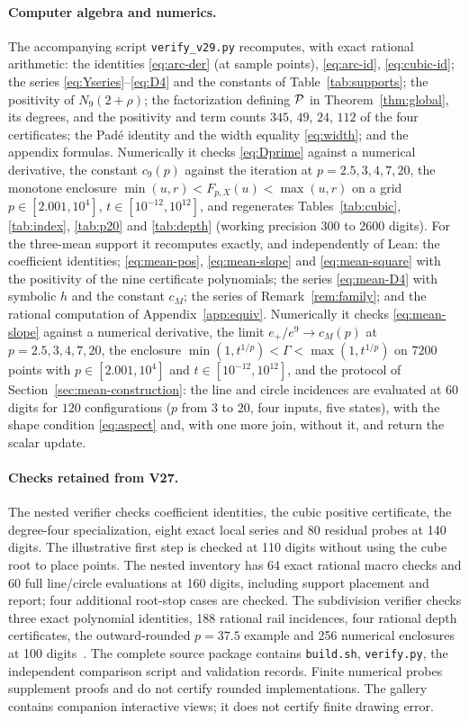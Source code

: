 \paragraph{Computer algebra and numerics.}
The accompanying script \texttt{verify\_v29.py} recomputes, with exact rational arithmetic: the
identities \eqref{eq:arc-der} (at sample points), \eqref{eq:arc-id}, \eqref{eq:cubic-id}; the series
\eqref{eq:Yseries}--\eqref{eq:D4} and the constants of Table~\ref{tab:supports}; the positivity of
$N_9(2+\rho)$; the factorization defining $\mathcal{P}$ in Theorem~\ref{thm:global}, its degrees, and the
positivity and term counts $345$, $49$, $24$, $112$ of the four certificates; the Pad\'e identity and
the width equality \eqref{eq:width}; and the appendix formulas. Numerically it checks
\eqref{eq:Dprime} against a numerical derivative, the constant $c_9(p)$ against the iteration
at $p=2.5,3,4,7,20$, the monotone enclosure $\min(u,r)<F_{p,X}(u)<\max(u,r)$ on a grid
$p\in[2.001,10^{4}]$, $t\in[10^{-12},10^{12}]$, and regenerates Tables~\ref{tab:cubic}, \ref{tab:index},
\ref{tab:p20} and \ref{tab:depth} (working precision 300 to 2600 digits). For the three-mean support
it recomputes exactly, and independently of Lean: the coefficient identities; \eqref{eq:mean-pos},
\eqref{eq:mean-slope} and \eqref{eq:mean-square} with the positivity of the nine certificate
polynomials; the series \eqref{eq:mean-D4} with symbolic $h$ and the constant $c_M$; the series of
Remark~\ref{rem:family}; and the rational computation of Appendix~\ref{app:equiv}. Numerically it
checks \eqref{eq:mean-slope} against a numerical derivative, the limit $e_+/e^{9}\to c_M(p)$ at
$p=2.5,3,4,7,20$, the enclosure $\min(1,t^{1/p})<\Gamma<\max(1,t^{1/p})$ on $7200$ points with
$p\in[2.001,10^{4}]$ and $t\in[10^{-12},10^{12}]$, and the protocol of
Section~\ref{sec:mean-construction}: the line and circle incidences are evaluated at $60$ digits for
$120$ configurations ($p$ from $3$ to $20$, four inputs, five states), with the shape condition
\eqref{eq:aspect} and, with one more join, without it, and return the scalar update.

\paragraph{Checks retained from V27.}
The nested verifier checks coefficient identities, the cubic positive certificate, the degree-four
specialization, eight exact local series and 80 residual probes at 140 digits. The illustrative first
step is checked at 110 digits without using the cube root to place points. The nested inventory has 64
exact rational macro checks and 60 full line/circle evaluations at 160 digits, including support
placement and report; four additional root-stop cases are checked. The subdivision verifier checks
three exact polynomial identities, 188 rational rail incidences, four rational depth certificates, the
outward-rounded $p=37.5$ example and 256 numerical enclosures at 100 digits~\cite{supplS}. The complete
source package contains \texttt{build.sh}, \texttt{verify.py}, the independent comparison script and
validation records. Finite numerical probes supplement proofs and do not certify rounded
implementations. The gallery contains companion interactive views; it does not certify finite drawing
error.

